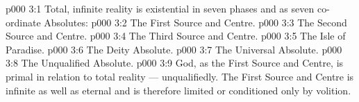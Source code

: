 \vs p000 3:1 Total, infinite reality is existential in seven phases and as seven co\hyp{}ordinate Absolutes:
\vs p000 3:2 \bibnobreakspace The First Source and Centre.
\vs p000 3:3 \bibnobreakspace The Second Source and Centre.
\vs p000 3:4 \bibnobreakspace The Third Source and Centre.
\vs p000 3:5 \bibnobreakspace The Isle of Paradise.
\vs p000 3:6 \bibnobreakspace The Deity Absolute.
\vs p000 3:7 \bibnobreakspace The Universal Absolute.
\vs p000 3:8 \bibnobreakspace The Unqualified Absolute.
\vs p000 3:9 \pc God, as the First Source and Centre, is primal in relation to total reality --- unqualifiedly. The First Source and Centre is infinite as well as eternal and is therefore limited or conditioned only by volition.
